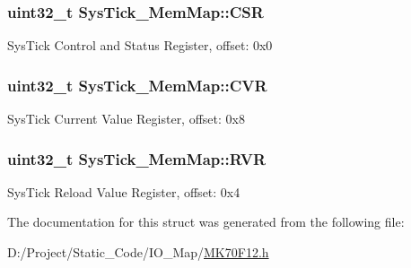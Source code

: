 \subsubsection[{C\+S\+R}]{\setlength{\rightskip}{0pt plus 5cm}uint32\+\_\+t Sys\+Tick\+\_\+\+Mem\+Map\+::\+C\+S\+R}\label{struct_sys_tick___mem_map_aec23689880afd46876916055403e867a}
Sys\+Tick Control and Status Register, offset\+: 0x0 \hypertarget{struct_sys_tick___mem_map_a508dd628bc347f199e7baf4b1bfbfa0d}{}
\subsubsection[{C\+V\+R}]{\setlength{\rightskip}{0pt plus 5cm}uint32\+\_\+t Sys\+Tick\+\_\+\+Mem\+Map\+::\+C\+V\+R}\label{struct_sys_tick___mem_map_a508dd628bc347f199e7baf4b1bfbfa0d}
Sys\+Tick Current Value Register, offset\+: 0x8 \hypertarget{struct_sys_tick___mem_map_a3f2018b492fd4bc1d141a718d499e50f}{}
\subsubsection[{R\+V\+R}]{\setlength{\rightskip}{0pt plus 5cm}uint32\+\_\+t Sys\+Tick\+\_\+\+Mem\+Map\+::\+R\+V\+R}\label{struct_sys_tick___mem_map_a3f2018b492fd4bc1d141a718d499e50f}
Sys\+Tick Reload Value Register, offset\+: 0x4 

The documentation for this struct was generated from the following file\+:\begin{DoxyCompactItemize}
\item 
D\+:/\+Project/\+Static\+\_\+\+Code/\+I\+O\+\_\+\+Map/\hyperlink{_m_k70_f12_8h}{M\+K70\+F12.\+h}\end{DoxyCompactItemize}
